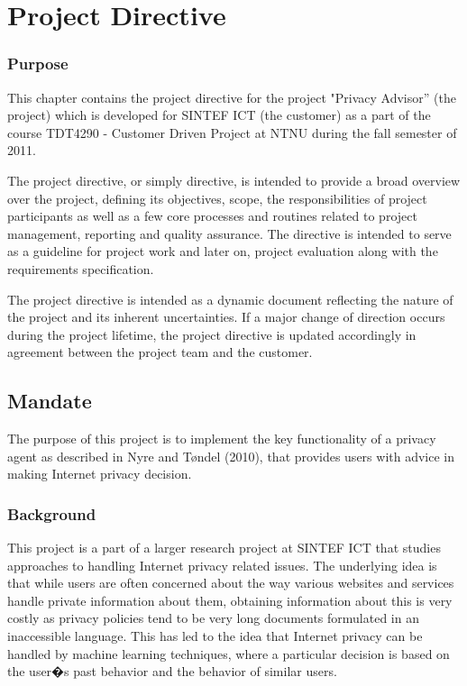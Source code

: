  

\chapter{Project Directive}
\label{directive}
\minitoc

\subsection*{Purpose}
This chapter contains the project directive for the project "Privacy Advisor'' (the project) which is developed for SINTEF ICT (the customer) as a part of the course TDT4290 - Customer Driven Project at NTNU during the fall semester of 2011.

The project directive, or simply directive, is intended to provide a broad overview over the project, defining its objectives, scope, the responsibilities of project participants as well as a few core processes and routines related to project management, reporting and quality assurance. The directive is intended to serve as a guideline for project work and later on, project evaluation along with the requirements specification.

The project directive is intended as a dynamic document reflecting the nature of the project and its inherent uncertainties. If a major change of direction occurs during the project lifetime, the project directive is updated accordingly in agreement between the project team and the customer.

\section{Mandate}
The purpose of this project is to implement the key functionality of a privacy agent as described in Nyre and T{\o}ndel (2010), that provides users with advice in making Internet privacy decision. 

\subsection{Background}
This project is a part of a larger research project at SINTEF ICT that studies approaches to handling Internet privacy related issues. The underlying idea is that while users are often concerned about the way various websites and services handle private information about them, obtaining information about this is very costly as privacy policies tend to be very long documents formulated in an inaccessible language. This has led to the idea that Internet privacy can be handled by machine learning techniques, where a particular decision is based on the user�s past behavior and the behavior of similar users.

